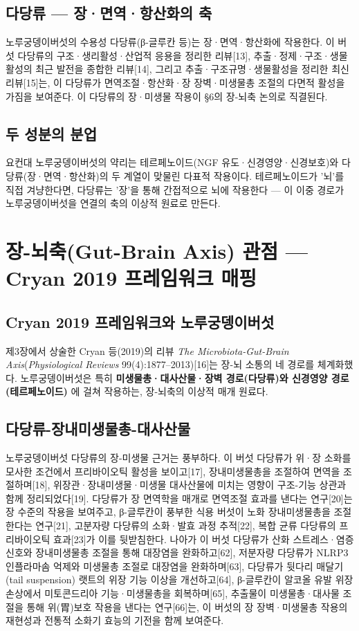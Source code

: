 \documentclass[11pt,oneside]{book}
\begin{document}
\subsection{다당류 — 장·면역·항산화의 축}
노루궁뎅이버섯의 수용성 다당류(β-글루칸 등)는 장·면역·항산화에 작용한다. 이 버섯 다당류의 구조·생리활성·산업적 응용을 정리한 리뷰[13], 추출·정제·구조·생물활성의 최근 발전을 종합한 리뷰[14], 그리고 추출·구조규명·생물활성을 정리한 최신 리뷰[15]는, 이 다당류가 면역조절·항산화·장 장벽·미생물총 조절의 다면적 활성을 가짐을 보여준다. 이 다당류의 장·미생물 작용이 §6의 장-뇌축 논의로 직결된다.

\subsection{두 성분의 분업}
요컨대 노루궁뎅이버섯의 약리는 테르페노이드(NGF 유도·신경영양·신경보호)와 다당류(장·면역·항산화)의 두 계열이 맞물린 다표적 작용이다. 테르페노이드가 '뇌'를 직접 겨냥한다면, 다당류는 '장'을 통해 간접적으로 뇌에 작용한다 — 이 이중 경로가 노루궁뎅이버섯을 연결의 축의 이상적 원료로 만든다.

\section{장-뇌축(Gut-Brain Axis) 관점 — Cryan 2019 프레임워크 매핑}
\subsection{Cryan 2019 프레임워크와 노루궁뎅이버섯}
제3장에서 상술한 Cryan 등(2019)의 리뷰 \textit{The Microbiota-Gut-Brain Axis}(\textit{Physiological Reviews} 99(4):1877–2013)[16]는 장-뇌 소통의 네 경로를 체계화했다. 노루궁뎅이버섯은 특히 \textbf{미생물총·대사산물·장벽 경로(다당류)와 신경영양 경로(테르페노이드)} 에 걸쳐 작용하는, 장-뇌축의 이상적 매개 원료다.

\subsection{다당류-장내미생물총-대사산물}
노루궁뎅이버섯 다당류의 장-미생물 근거는 풍부하다. 이 버섯 다당류가 위·장 소화를 모사한 조건에서 프리바이오틱 활성을 보이고[17], 장내미생물총을 조절하여 면역을 조절하며[18], 위장관·장내미생물·미생물 대사산물에 미치는 영향이 구조-기능 상관과 함께 정리되었다[19]. 다당류가 장 면역학을 매개로 면역조절 효과를 낸다는 연구[20]는 장 수준의 작용을 보여주고, β-글루칸이 풍부한 식용 버섯이 노화 장내미생물총을 조절한다는 연구[21], 고분자량 다당류의 소화·발효 과정 추적[22], 복합 균류 다당류의 프리바이오틱 효과[23]가 이를 뒷받침한다. 나아가 이 버섯 다당류가 산화 스트레스·염증 신호와 장내미생물총 조절을 통해 대장염을 완화하고[62], 저분자량 다당류가 NLRP3 인플라마솜 억제와 미생물총 조절로 대장염을 완화하며[63], 다당류가 뒷다리 매달기(tail suspension) 랫트의 위장 기능 이상을 개선하고[64], β-글루칸이 알코올 유발 위장 손상에서 미토콘드리아 기능·미생물총을 회복하며[65], 추출물이 미생물총·대사물 조절을 통해 위(胃)보호 작용을 낸다는 연구[66]는, 이 버섯의 장 장벽·미생물총 작용의 재현성과 전통적 소화기 효능의 기전을 함께 보여준다.
\end{document}
